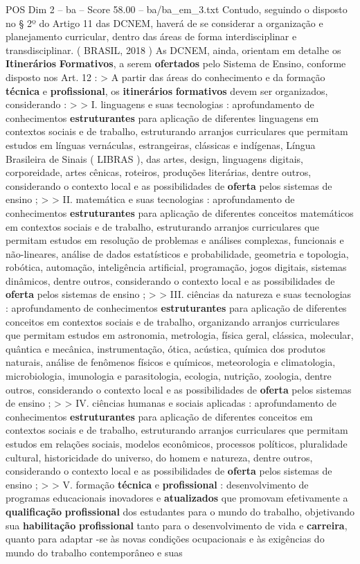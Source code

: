 \begin{textsample}{POS Dim 2 – ba – Score 58.00 – ba/ba\_em\_3.txt}
Contudo, seguindo o disposto no § 2º do Artigo 11 das DCNEM, haverá de se considerar a organização e planejamento curricular, dentro das áreas de forma interdisciplinar e transdisciplinar. ( BRASIL, 2018 ) As DCNEM, ainda, orientam em detalhe os \textbf{Itinerários} \textbf{Formativos}, a serem \textbf{ofertados} pelo Sistema de Ensino, conforme disposto nos Art. 12 : > A partir das áreas do conhecimento e da formação \textbf{técnica} e \textbf{profissional}, os \textbf{itinerários} \textbf{formativos} devem ser organizados, considerando : > > I. linguagens e suas tecnologias : aprofundamento de conhecimentos \textbf{estruturantes} para aplicação de diferentes linguagens em contextos sociais e de trabalho, estruturando arranjos curriculares que permitam estudos em línguas vernáculas, estrangeiras, clássicas e indígenas, Língua Brasileira de Sinais ( LIBRAS ), das artes, design, linguagens digitais, corporeidade, artes cênicas, roteiros, produções literárias, dentre outros, considerando o contexto local e as possibilidades de \textbf{oferta} pelos sistemas de ensino ; > > II. matemática e suas tecnologias : aprofundamento de conhecimentos \textbf{estruturantes} para aplicação de diferentes conceitos matemáticos em contextos sociais e de trabalho, estruturando arranjos curriculares que permitam estudos em resolução de problemas e análises complexas, funcionais e não-lineares, análise de dados estatísticos e probabilidade, geometria e topologia, robótica, automação, inteligência artificial, programação, jogos digitais, sistemas dinâmicos, dentre outros, considerando o contexto local e as possibilidades de \textbf{oferta} pelos sistemas de ensino ; > > III. ciências da natureza e suas tecnologias : aprofundamento de conhecimentos \textbf{estruturantes} para aplicação de diferentes conceitos em contextos sociais e de trabalho, organizando arranjos curriculares que permitam estudos em astronomia, metrologia, física geral, clássica, molecular, quântica e mecânica, instrumentação, ótica, acústica, química dos produtos naturais, análise de fenômenos físicos e químicos, meteorologia e climatologia, microbiologia, imunologia e parasitologia, ecologia, nutrição, zoologia, dentre outros, considerando o contexto local e as possibilidades de \textbf{oferta} pelos sistemas de ensino ; > > IV. ciências humanas e sociais aplicadas : aprofundamento de conhecimentos \textbf{estruturantes} para aplicação de diferentes conceitos em contextos sociais e de trabalho, estruturando arranjos curriculares que permitam estudos em relações sociais, modelos econômicos, processos políticos, pluralidade cultural, historicidade do universo, do homem e natureza, dentre outros, considerando o contexto local e as possibilidades de \textbf{oferta} pelos sistemas de ensino ; > > V. formação \textbf{técnica} e \textbf{profissional} : desenvolvimento de programas educacionais inovadores e \textbf{atualizados} que promovam efetivamente a \textbf{qualificação} \textbf{profissional} dos estudantes para o mundo do trabalho, objetivando sua \textbf{habilitação} \textbf{profissional} tanto para o desenvolvimento de vida e \textbf{carreira}, quanto para adaptar -se às novas condições ocupacionais e às exigências do mundo do trabalho contemporâneo e suas 
\end{textsample}
